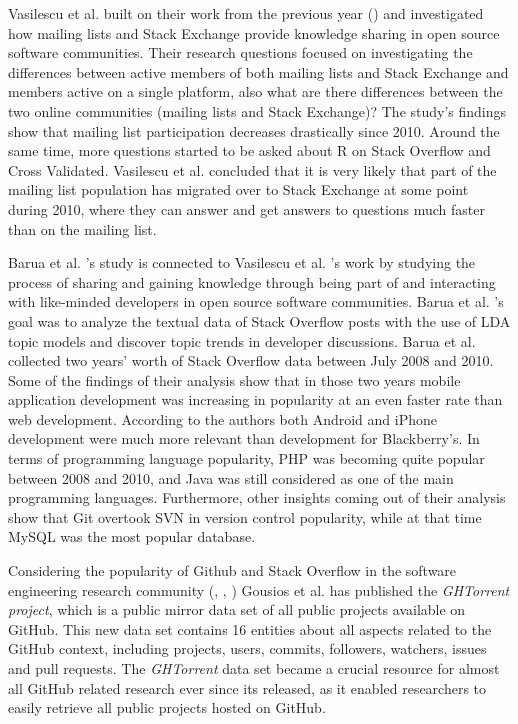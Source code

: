         Vasilescu et al. \cite{vasilescu2014social} built on their work from the previous year (\cite{vasilescu2013stackoverflow}) and investigated how mailing lists and Stack Exchange provide knowledge sharing in open source software communities. Their research questions focused on investigating the differences between active members of both mailing lists and Stack Exchange and members active on a single platform, also what are there differences between the two online communities (mailing lists and Stack Exchange)? The study's findings show that mailing list participation decreases drastically since 2010. Around the same time, more questions started to be asked about R on Stack Overflow and Cross Validated. Vasilescu et al. concluded that it is very likely that part of the mailing list population has migrated over to Stack Exchange at some point during 2010, where they can answer and get answers to questions much faster than on the mailing list.
        
        Barua et al. \cite{barua2014developers}'s study is connected to Vasilescu et al. \cite{vasilescu2014social}'s work by studying the process of sharing and gaining knowledge through being part of and interacting with like-minded developers in open source software communities. Barua et al. \cite{barua2014developers}'s goal was to analyze the textual data of Stack Overflow posts with the use of LDA topic models and discover topic trends in developer discussions. Barua et al. collected two years' worth of Stack Overflow data between July 2008 and 2010. Some of the findings of their analysis show that in those two years mobile application development was increasing in popularity at an even faster rate than web development. According to the authors both Android and iPhone development were much more relevant than development for Blackberry's. In terms of programming language popularity, PHP was becoming quite popular between 2008 and 2010, and  Java was still considered as one of the main programming languages. Furthermore, other insights coming out of their analysis show that Git overtook SVN in version control popularity, while at that time MySQL was the most popular database.
        
        Considering the popularity of Github and Stack Overflow in the software engineering research community (\cite{vasilescu2013stackoverflow}, \cite{badashian2014involvement}, \cite{lee2017github}) Gousios et al. \cite{gousios2013ghtorent} has published the \emph{GHTorrent project}, which is a public mirror data set of all public projects available on GitHub. This new data set contains 16 entities about all aspects related to the GitHub context, including projects, users, commits, followers, watchers, issues and pull requests. The \emph{GHTorrent} data set became a crucial resource for almost all GitHub related research ever since its released, as it enabled researchers to easily retrieve all public projects hosted on GitHub. 
        

